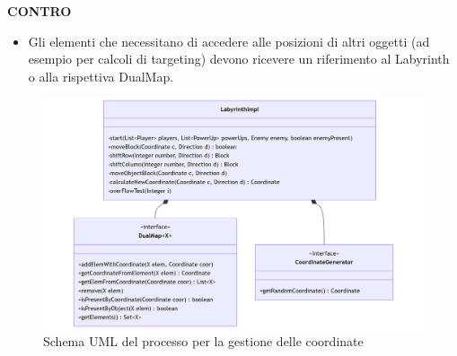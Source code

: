\documentclass[a4paper,12pt]{report}
\begin{document}
\textbf{CONTRO}
\begin{itemize}
	\item Gli elementi che necessitano di accedere alle posizioni di altri oggetti (ad esempio per calcoli di targeting) devono ricevere un 
	riferimento al Labyrinth o alla rispettiva DualMap.
\end{itemize}
\begin{figure}[H]
	\centering{}
	\includegraphics[width=14cm]{img/GestioneCoordinate.png}
	\caption{Schema UML del processo per la gestione delle coordinate}
	\label{img:Gestione Coordinate}
\end{figure}
\end{document}
